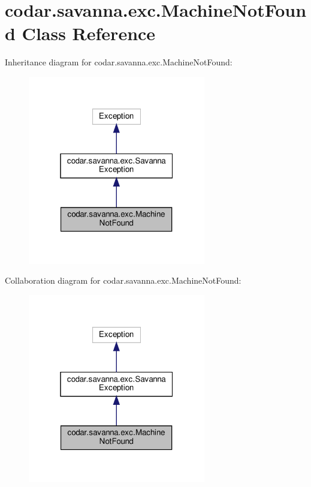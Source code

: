 \hypertarget{classcodar_1_1savanna_1_1exc_1_1_machine_not_found}{}\section{codar.\+savanna.\+exc.\+Machine\+Not\+Found Class Reference}
\label{classcodar_1_1savanna_1_1exc_1_1_machine_not_found}


Inheritance diagram for codar.\+savanna.\+exc.\+Machine\+Not\+Found\+:
\nopagebreak
\begin{figure}[H]
\begin{center}
\leavevmode
\includegraphics[width=220pt]{classcodar_1_1savanna_1_1exc_1_1_machine_not_found__inherit__graph}
\end{center}
\end{figure}


Collaboration diagram for codar.\+savanna.\+exc.\+Machine\+Not\+Found\+:
\nopagebreak
\begin{figure}[H]
\begin{center}
\leavevmode
\includegraphics[width=220pt]{classcodar_1_1savanna_1_1exc_1_1_machine_not_found__coll__graph}
\end{center}
\end{figure}
